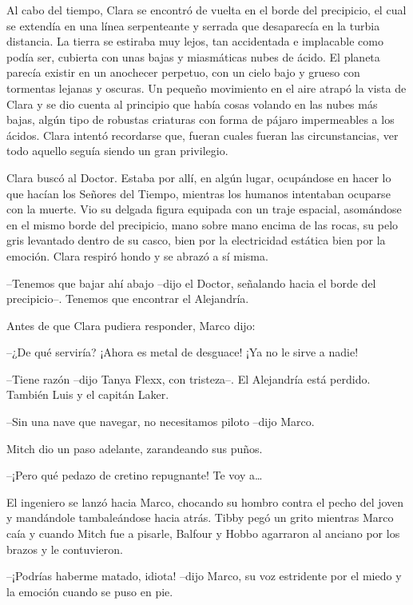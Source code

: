 {Al cabo del tiempo, Clara se encontró de vuelta en el borde del
 precipicio, el cual se extendía en una línea serpenteante y serrada que
 desaparecía en la turbia distancia. La tierra se estiraba muy lejos, tan
 accidentada e implacable como podía ser, cubierta con unas bajas y
 miasmáticas nubes de ácido. El planeta parecía existir en un anochecer
 perpetuo, con un cielo bajo y grueso con tormentas lejanas y oscuras. Un
 pequeño movimiento en el aire atrapó la vista de Clara y se dio cuenta
 al principio que había cosas volando en las nubes más bajas, algún tipo
 de robustas criaturas con forma de pájaro impermeables a los ácidos.
 Clara intentó recordarse que, fueran cuales fueran las circunstancias,
ver todo aquello seguía siendo un gran privilegio.}

{Clara buscó al Doctor. Estaba por allí, en algún lugar, ocupándose en
 hacer lo que hacían los Señores del Tiempo, mientras los humanos
 intentaban ocuparse con la muerte. Vio su delgada figura equipada con un
 traje espacial, asomándose en el mismo borde del precipicio, mano sobre
 mano encima de las rocas, su pelo gris levantado dentro de su casco,
 bien por la electricidad estática bien por la emoción. Clara respiró
hondo y se abrazó a sí misma.}

{--Tenemos que bajar ahí abajo --dijo el Doctor, señalando hacia el borde
del precipicio--. Tenemos que encontrar el Alejandría.}

{Antes de que Clara pudiera responder, Marco dijo:}

{--¿De qué serviría? ¡Ahora es metal de desguace! ¡Ya no le sirve a
nadie!}

{--Tiene razón --dijo Tanya Flexx, con tristeza--. El Alejandría está
perdido. También Luis y el capitán Laker.}

{--Sin una nave que navegar, no necesitamos piloto --dijo Marco.}

{Mitch dio un paso adelante, zarandeando sus puños.}

{--¡Pero qué pedazo de cretino repugnante! Te voy a\ldots{}}

{El ingeniero se lanzó hacia Marco, chocando su hombro contra el pecho
 del joven y mandándole tambaleándose hacia atrás. Tibby pegó un grito
 mientras Marco caía y cuando Mitch fue a pisarle, Balfour y Hobbo
agarraron al anciano por los brazos y le contuvieron.}

{--¡Podrías haberme matado, idiota! --dijo Marco, su voz estridente por
el miedo y la emoción cuando se puso en pie.}

